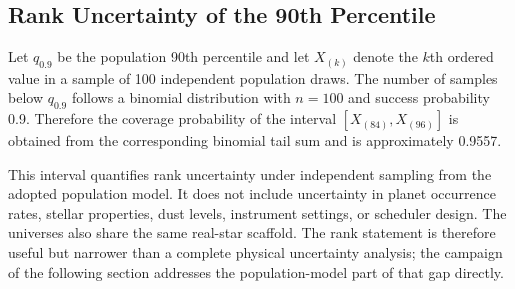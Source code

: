 \documentclass[12pt,a4paper]{article}
\numberwithin{equation}{section}
\numberwithin{figure}{section}
\numberwithin{table}{section}
\begin{document}
\subsection{Rank Uncertainty of the 90th Percentile}
Let $q_{0.9}$ be the population 90th percentile and let $X_{(k)}$ denote the $k$th ordered value in a sample of 100 independent population draws. The number of samples below $q_{0.9}$ follows a binomial distribution with $n=100$ and success probability 0.9. Therefore the coverage probability of the interval $[X_{(84)},X_{(96)}]$ is obtained from the corresponding binomial tail sum and is approximately 0.9557.

This interval quantifies rank uncertainty under independent sampling from the adopted population model. It does not include uncertainty in planet occurrence rates, stellar properties, dust levels, instrument settings, or scheduler design. The universes also share the same real-star scaffold. The rank statement is therefore useful but narrower than a complete physical uncertainty analysis; the campaign of the following section addresses the population-model part of that gap directly.
\end{document}

